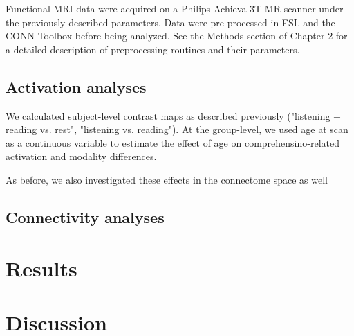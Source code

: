 Functional MRI data were acquired on a Philips Achieva 3T MR scanner under the previously described parameters. Data were pre-processed in FSL and the CONN Toolbox before being analyzed. See the Methods section of Chapter 2 for a detailed description of preprocessing routines and their parameters.

\subsection{Activation analyses}

We calculated subject-level contrast maps as described previously ("listening + reading vs. rest", "listening vs. reading"). At the group-level, we used age at scan as a continuous variable to estimate the effect of age on comprehensino-related activation and modality differences.

As before, we also investigated these effects in the connectome space as well 


\subsection{Connectivity analyses}


\section{Results}

\begin{figure}[t]
	\centering
    \caption[Relationship between activation in visual word form area and age.]{}
\end{figure}


\begin{figure}[t]
	\centering
    \caption[Global participation coefficient as a function of age.]{}
\end{figure}


\begin{figure}[t]
	\centering
    \caption[Similarity between reading and listening networks as a function of age.]{}
\end{figure}


\begin{figure}[t]
	\centering
    \caption[]{}
\end{figure}

\section{Discussion}


